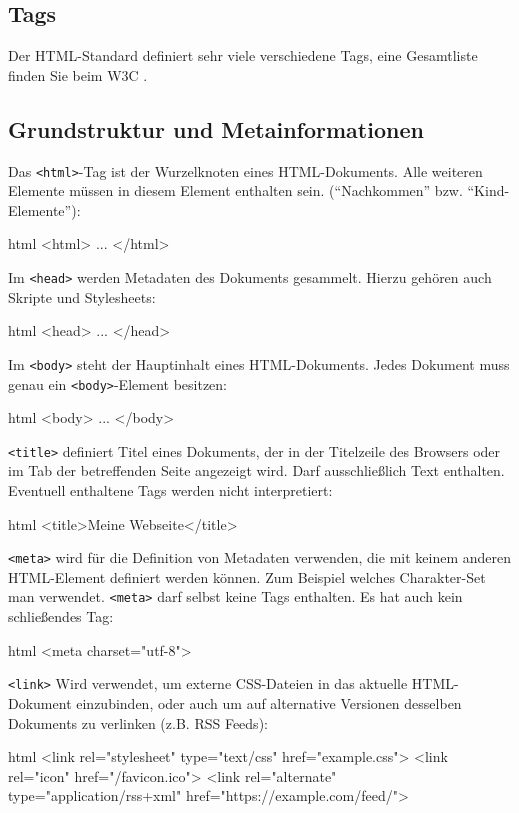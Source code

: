 \documentclass[10pt,a4paper]{article}
\begin{document}
\begin{multicols}{3}
\section*{Tags}
Der HTML-Standard definiert sehr viele verschiedene Tags, eine Gesamtliste finden Sie beim W3C \cite{w3c-elements}.

\subsection*{Grundstruktur und Metainformationen}
Das \texttt{<html>}-Tag ist der Wurzelknoten eines HTML-Dokuments. Alle weiteren Elemente müssen in diesem Element enthalten sein. (\enquote{Nachkommen} bzw. \enquote{Kind-Elemente}):
\begin{codebox}{html}{}
<html> ... </html>
\end{codebox}

Im \texttt{<head>} werden Metadaten des Dokuments gesammelt. Hierzu gehören auch Skripte und Stylesheets:
\begin{codebox}{html}{}
<head> ... </head>
\end{codebox}

Im \texttt{<body>} steht der Hauptinhalt eines HTML-Dokuments. Jedes Dokument muss genau ein \texttt{<body>}-Element besitzen:
\begin{codebox}{html}{}
<body> ... </body>
\end{codebox}

\texttt{<title>} definiert Titel eines Dokuments, der in der Titelzeile des Browsers oder im Tab der betreffenden Seite angezeigt wird. Darf ausschließlich Text enthalten. Eventuell enthaltene Tags werden nicht interpretiert:
\begin{codebox}{html}{}
<title>Meine Webseite</title>
\end{codebox}

\texttt{<meta>} wird für die Definition von Metadaten verwenden, die mit keinem anderen HTML-Element definiert werden können. Zum Beispiel welches Charakter-Set man verwendet. \texttt{<meta>} darf selbst keine Tags enthalten. Es hat auch kein schließendes Tag:
\begin{codebox}{html}{}
<meta charset="utf-8">
\end{codebox}

\texttt{<link>} Wird verwendet, um externe CSS-Dateien in das aktuelle HTML-Dokument einzubinden, oder auch um auf alternative Versionen desselben Dokuments zu verlinken (z.B. RSS Feeds):
\begin{codebox}{html}{}
<link rel="stylesheet" type="text/css" href="example.css">
<link rel="icon" href="/favicon.ico">
<link rel="alternate" type="application/rss+xml" href="https://example.com/feed/">
\end{codebox}


\end{multicols}
\end{document}
